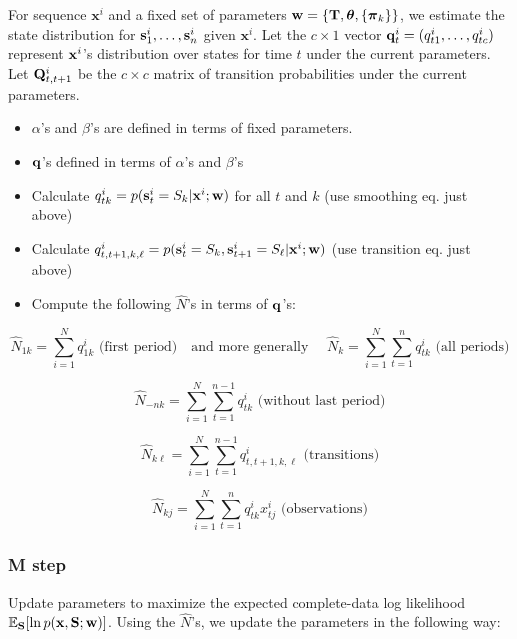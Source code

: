 \documentclass[12pt]{article}
\begin{document}
For sequence $\mathbf{x}^i$ and a fixed set of parameters $\mathbf{w} = \{\mathbf{T}, \boldsymbol{\theta}, \{\boldsymbol{\pi}_k\}\}$, we estimate the state distribution for $\mathbf{s}_1^i,\ldots,\mathbf{s}_n^i$ given $\mathbf{x}^i$. Let the $c \times 1$ vector $\mathbf{q}_t^i = (q_{t1}^i,\ldots,q_{tc}^i)$ represent $\mathbf{x}^i$'s distribution over states for time $t$ under the current parameters. Let $\mathbf{Q}_{t,t+1}^i$ be the $c \times c$ matrix of transition probabilities under the current parameters.

\begin{itemize}
	
	\item $\alpha$'s and $\beta$'s are  defined in terms of fixed parameters.
	
	\item $\mathbf{q}$'s defined in terms of $\alpha$'s and $\beta$'s 
	
	\item Calculate $q_{tk}^i = p(\mathbf{s}_t^i = S_k | \mathbf{x}^i;\mathbf{w})$ for all $t$ and $k$ (use smoothing eq. just above)
	
	\item Calculate $q_{t,t+1,k,\ell}^i = p(\mathbf{s}_t^i = S_k,\mathbf{s}_{t+1}^i = S_\ell | \mathbf{x}^i;\mathbf{w})$ (use transition eq. just above)
	
	\item Compute the following $\hat{N}$'s in terms of $\mathbf{q}$'s:
	
\end{itemize}

$$\hat{N}_{1k} = \sum_{i=1}^N q^i_{1k} \textrm{ (first period)} \quad \textrm{and more generally } \quad  \hat{N}_{k} = \sum_{i=1}^N\sum_{t=1}^n q^i_{tk} \textrm{ (all periods)}$$


$$\hat{N}_{-nk} = \sum_{i=1}^N\sum_{t=1}^{n-1} q^i_{tk} \textrm{ (without last period)}$$

$$\hat{N}_{k\ell} = \sum_{i=1}^N\sum_{t=1}^{n-1}q_{t,t+1,k,\ell}^i \textrm{ (transitions)} $$

$$\hat{N}_{kj} = \sum_{i=1}^N\sum_{t=1}^n q^i_{tk}x^i_{tj} \textrm { (observations)} $$


\subsubsection{M step}

Update parameters to maximize the expected complete-data log likelihood $\mathbb{E}_{\mathbf{S}}[\ln p(\mathbf{x},\mathbf{S};\mathbf{w})]$. Using the $\hat{N}$'s, we update the parameters in the following way:
\end{document}
